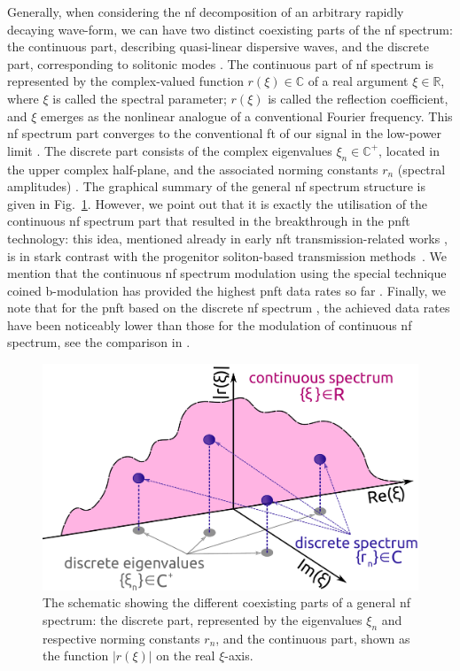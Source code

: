 Generally, when considering the \acrshort{nf} decomposition of an arbitrary rapidly decaying wave-form, we can have two distinct coexisting parts of the \acrshort{nf} spectrum: the continuous part, describing quasi-linear dispersive waves, and the discrete part, corresponding to solitonic modes \cite{nmp84,akn74,turitsyn2017nonlinear,yk14-1}. The continuous part of \acrshort{nf} spectrum is represented by the complex-valued function $r(\xi) \in \mathbb{C}$ of a real argument $\xi \in \mathbb{R}$, where $\xi$ is called the spectral parameter; $r(\xi)$ is called the reflection coefficient, and $\xi$ emerges as the nonlinear analogue of a conventional Fourier frequency. This \acrshort{nf} spectrum part converges to the conventional \acrshort{ft} of our signal in the low-power limit \cite{pdt13}. The discrete part consists of the complex eigenvalues $\xi_n \in \mathbb{C}^{+}$, located in the upper complex half-plane, and the associated norming constants $r_n$ (spectral amplitudes) \cite{a16}. The graphical summary of the general \acrshort{nf} spectrum structure is given in Fig.~\ref{fig:spectrum_representation}. However, we point out that it is exactly the utilisation of the continuous \acrshort{nf} spectrum part \cite{pdbgt14,lpt14,lpt15,lpr15,lpphet16,lab17,kplt17_2,yy19} that resulted in the breakthrough in the \acrshort{pnft} technology: this idea, mentioned already in early \acrshort{nft} transmission-related works \cite{yk14-1,pdt13}, is in stark contrast with the progenitor soliton-based transmission methods~\cite{mg06}. We mention that the continuous \acrshort{nf} spectrum modulation using the special technique coined b-modulation \cite{w17,gzl18,svp20,cw20} has provided the highest \acrshort{pnft} data rates so far \cite{yal19,yla19}.  Finally, we note that for the \acrshort{pnft} based on the discrete \acrshort{nf} spectrum \cite{hyk16,bai16,wxz20}, the achieved data rates have been noticeably lower than those for the modulation of continuous \acrshort{nf} spectrum, see the comparison in \cite[Fig. 1]{yal19}.
\begin{figure}[tbh]
    \centering
    \includegraphics[width=0.55\linewidth]{images/nn_nft/nft_spectrum_representation_6.pdf}
    \caption{The schematic showing the different coexisting parts of a general \acrshort{nf} spectrum: the discrete part, represented by the eigenvalues $\xi_n$ and respective norming constants $r_n$, and the continuous part, shown as the function $|r(\xi)|$ on the real $\xi$-axis. }
    \label{fig:spectrum_representation}
\end{figure}

